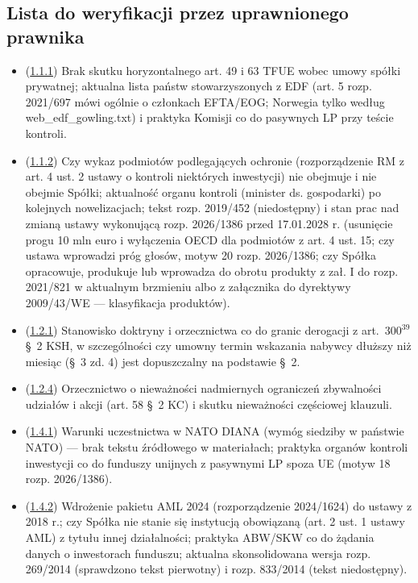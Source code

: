 \documentclass[12pt,a4paper]{report}
\begin{document}
\subsection*{Lista do weryfikacji przez uprawnionego prawnika}
\begin{itemize}
  \item (\hyperref[memo:1.1.1]{1.1.1}) Brak skutku horyzontalnego art. 49 i 63 TFUE wobec umowy spółki prywatnej; aktualna lista państw stowarzyszonych z EDF (art. 5 rozp. 2021/697 mówi ogólnie o członkach EFTA/EOG; Norwegia tylko według web\_edf\_gowling.txt) i praktyka Komisji co do pasywnych LP przy teście kontroli.
  \item (\hyperref[memo:1.1.2]{1.1.2}) Czy wykaz podmiotów podlegających ochronie (rozporządzenie RM z art. 4 ust. 2 ustawy o kontroli niektórych inwestycji) nie obejmuje i nie obejmie Spółki; aktualność organu kontroli (minister ds. gospodarki) po kolejnych nowelizacjach; tekst rozp. 2019/452 (niedostępny) i stan prac nad zmianą ustawy wykonującą rozp. 2026/1386 przed 17.01.2028 r. (usunięcie progu 10 mln euro i wyłączenia OECD dla podmiotów z art. 4 ust. 15; czy ustawa wprowadzi próg głosów, motyw 20 rozp. 2026/1386; czy Spółka opracowuje, produkuje lub wprowadza do obrotu produkty z zał. I do rozp. 2021/821 w aktualnym brzmieniu albo z załącznika do dyrektywy 2009/43/WE — klasyfikacja produktów).
  \item (\hyperref[memo:1.2.1]{1.2.1}) Stanowisko doktryny i orzecznictwa co do granic derogacji z art.~300$^{39}$ §~2 KSH, w szczególności czy umowny termin wskazania nabywcy dłuższy niż miesiąc (§~3 zd. 4) jest dopuszczalny na podstawie §~2.
  \item (\hyperref[memo:1.2.4]{1.2.4}) Orzecznictwo o nieważności nadmiernych ograniczeń zbywalności udziałów i akcji (art. 58 §~2 KC) i skutku nieważności częściowej klauzuli.
  \item (\hyperref[memo:1.4.1]{1.4.1}) Warunki uczestnictwa w NATO DIANA (wymóg siedziby w państwie NATO) — brak tekstu źródłowego w materiałach; praktyka organów kontroli inwestycji co do funduszy unijnych z pasywnymi LP spoza UE (motyw 18 rozp. 2026/1386).
  \item (\hyperref[memo:1.4.2]{1.4.2}) Wdrożenie pakietu AML 2024 (rozporządzenie 2024/1624) do ustawy z 2018 r.; czy Spółka nie stanie się instytucją obowiązaną (art. 2 ust. 1 ustawy AML) z tytułu innej działalności; praktyka ABW/SKW co do żądania danych o inwestorach funduszu; aktualna skonsolidowana wersja rozp. 269/2014 (sprawdzono tekst pierwotny) i rozp. 833/2014 (tekst niedostępny).

\end{itemize}
\end{document}
